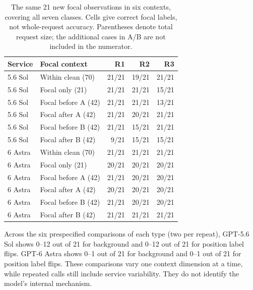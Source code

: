 \documentclass[11pt,a4paper]{article}
\begin{document}
\begin{table}[htbp]
\centering
\small
\caption{The same 21 new focal observations in six contexts, covering all seven classes. Cells give correct focal labels, not whole-request accuracy. Parentheses denote total request size; the additional cases in A/B are not included in the numerator.}
\label{tab:ind_context}
\begin{tabular}{@{}llrrr@{}}
\toprule
Service & Focal context & R1 & R2 & R3 \\
\midrule
5.6 Sol & Within clean (70) & 21/21 & 19/21 & 21/21 \\
5.6 Sol & Focal only (21) & 21/21 & 21/21 & 15/21 \\
5.6 Sol & Focal before A (42) & 21/21 & 21/21 & 13/21 \\
5.6 Sol & Focal after A (42) & 21/21 & 20/21 & 21/21 \\
5.6 Sol & Focal before B (42) & 21/21 & 15/21 & 21/21 \\
5.6 Sol & Focal after B (42) & 9/21 & 15/21 & 15/21 \\
6 Astra & Within clean (70) & 21/21 & 21/21 & 21/21 \\
6 Astra & Focal only (21) & 20/21 & 20/21 & 20/21 \\
6 Astra & Focal before A (42) & 21/21 & 20/21 & 20/21 \\
6 Astra & Focal after A (42) & 20/21 & 20/21 & 20/21 \\
6 Astra & Focal before B (42) & 21/21 & 20/21 & 20/21 \\
6 Astra & Focal after B (42) & 21/21 & 21/21 & 21/21 \\
\bottomrule
\end{tabular}
\end{table}
Across the six prespecified comparisons of each type (two per repeat), GPT-5.6 Sol shows 0--12 out of 21 for background and 0--12 out of 21 for position label flips. GPT-6 Astra shows 0--1 out of 21 for background and 0--1 out of 21 for position label flips. These comparisons vary one context dimension at a time, while repeated calls still include service variability. They do not identify the model's internal mechanism.
\end{document}
